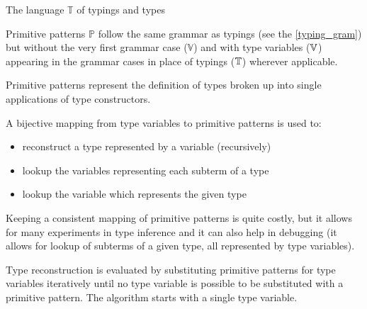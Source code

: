 \begin{lang}
  \def\grammarP{0.6}
  \begin{grammar}
  \end{grammar}
  \caption{The language $\mathbb{T}$ of typings and types}
  \label{lang:typing}
\end{lang}

\begin{defn}
    \label{def:primpat}
    Primitive patterns $\mathbb{P}$ follow the same grammar as typings (see the \cref{typing_gram}) but without the very first grammar case ($\mathbb{V}$) and with type variables ($\mathbb{V}$) appearing in the grammar cases in place of typings ($\mathbb{T}$) wherever applicable.

    Primitive patterns represent the definition of types broken up into single applications of type constructors.
\end{defn}

\begin{remark}
    A bijective mapping from type variables to primitive patterns is used to:

    \begin{itemize}
        \item reconstruct a type represented by a variable (recursively)
        \item lookup the variables representing each subterm of a type
        \item lookup the variable which represents the given type
    \end{itemize}

    Keeping a consistent mapping of primitive patterns is quite costly, but it allows for many experiments in type inference and it can also help in debugging (it allows for lookup of subterms of a given type, all represented by type variables).
\end{remark}

\begin{defn}
    Type reconstruction is evaluated by substituting primitive patterns for type variables iteratively until no type variable is possible to be substituted with a primitive pattern. The algorithm starts with a single type variable.
\end{defn}

